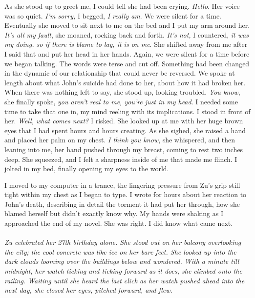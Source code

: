 \documentclass[12pt,oneside,openany]{memoir}
\begin{document}
	As she stood up to greet me, I could tell she had been crying. \textit{Hello}. Her voice was so quiet. \textit{I’m sorry,} I begged, \textit{I really am}. We were silent for a time. Eventually she moved to sit next to me on the bed and I put my arm around her. \textit{It’s all my fault}, she moaned, rocking back and forth. \textit{It’s not}, I countered, \textit{it was my doing, so if there is blame to lay, it is on me}. She shifted away from me after I said that and put her head in her hands. Again, we were silent for a time before we began talking. The words were terse and cut off. Something had been changed in the dynamic of our relationship that could never be reversed. We spoke at length about what John’s suicide had done to her, about how it had broken her. When there was nothing left to say, she stood up, looking troubled. \textit{You know}, she finally spoke, \textit{you aren’t real to me, you’re just in my head}. I needed some time to take that one in, my mind reeling with its implications. I stood in front of her. \textit{Well, what comes next? }I risked. She looked up at me with her huge brown eyes that I had spent hours and hours creating. As she sighed, she raised a hand and placed her palm on my chest. \textit{I think you know}, she whispered, and then leaning into me, her hand pushed through my breast, coming to rest two inches deep. She squeezed, and I felt a sharpness inside of me that made me flinch. I jolted in my bed, finally opening my eyes to the world. 
	
	I moved to my computer in a trance, the lingering pressure from Zu’s grip still tight within my chest as I began to type. I wrote for hours about her reaction to John’s death, describing in detail the torment it had put her through, how she blamed herself but didn’t exactly know why. My hands were shaking as I approached the end of my novel. She was right. I did know what came next.
\\\\
\indent\textit{Zu celebrated her 27th birthday alone. She stood out on her balcony overlooking the city; the cool concrete was like ice on her bare feet. She looked up into the dark clouds looming over the buildings below and wondered. With a minute till midnight, her watch ticking and ticking forward as it does, she climbed onto the railing. Waiting until she heard the last click as her watch pushed ahead into the next day, she closed her eyes, pitched forward, and flew.}
\end{document}
